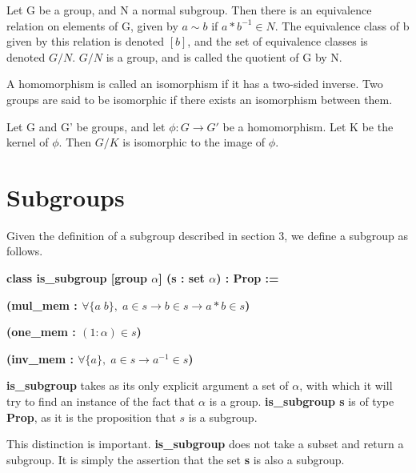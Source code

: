 \documentclass[runningheads,a4paper]{llncs}
\renewcommand{\a}{\alpha}
\renewcommand{\-}{\setminus}
\begin{document}
\begin{definition}
Let G be a group, and N a normal subgroup. Then there is an equivalence relation on elements of G, given by $a \sim b$ if $a * b^{-1} \in N$. The equivalence class of b given by this relation is denoted $[b]$, and the set of equivalence classes is denoted $G/N$. $G/N$ is a group, and is called the quotient of G by N.
\end{definition}

\begin{definition}[Isomorphism]
A homomorphism is called an isomorphism if it has a two-sided inverse. Two groups are said to be isomorphic if there exists an isomorphism between them.
\end{definition}

\begin{theorem}
Let G and G' be groups, and let $\phi : G \to G'$ be a homomorphism. Let K be the kernel of $\phi$. Then $G/K$ is isomorphic to the image of $\phi$.
\end{theorem}

\section{Subgroups}

Given the definition of a subgroup described in section 3, we define a subgroup as follows.

\vspace{2 mm}
\hspace{2 em}\textbf{class is\_subgroup [group $\a$] (s : set $\a$) : Prop :=}

\hspace{4 em}\textbf{(mul\_mem : $\forall \{a\; b\},\; a \in s \to b \in s \to a * b \in s$)}

\hspace{4 em}\textbf{(one\_mem : $(1 : \a) \in s$)}

\hspace{4 em}\textbf{(inv\_mem : $\forall \{a\},\; a \in s \to a^{-1} \in s$)}
\vspace{2 mm}

\textbf{is\_subgroup} takes as its only explicit argument a set of $\a$, with which it will try to find an instance of the fact that $\a$ is a group. \textbf{is\_subgroup s} is of type \textbf{Prop}, as it is the proposition that $s$ is a subgroup.

This distinction is important. \textbf{is\_subgroup} does not take a subset and return a subgroup. It is simply the assertion that the set \textbf{s} is also a subgroup.
\end{document}
